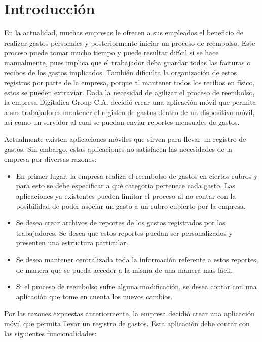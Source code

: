 \chapter*{Introducción} \label{sec:Introduccion}

\vspace{5 mm}
En la actualidad, muchas empresas le ofrecen a sus empleados el beneficio de realizar gastos personales y posteriormente iniciar un proceso de reembolso. Este proceso puede tomar mucho tiempo y puede resultar difícil si se hace manualmente, pues implica que el trabajador deba guardar todas las facturas o recibos de los gastos implicados. También dificulta la organización de estos registros por parte de la empresa, porque al mantener todos los recibos en físico, estos se pueden extraviar. Dada la necesidad de agilizar el proceso de reembolso, la empresa Digitalica Group C.A. decidió crear una aplicación móvil que permita a sus trabajadores mantener el registro de gastos dentro de un dispositivo móvil, así como un servidor al cual se puedan enviar reportes mensuales de gastos.

Actualmente existen aplicaciones móviles que sirven para llevar un registro de gastos. Sin embargo, estas aplicaciones no satisfacen las necesidades de la empresa por diversas razones:

\begin{itemize}
\item En primer lugar, la empresa realiza el reembolso de gastos en ciertos rubros y para esto se debe especificar a qué categoría pertenece cada gasto. Las aplicaciones ya existentes pueden limitar el proceso al no contar con la posibilidad de poder asociar un gasto a un rubro cubierto por la empresa.
\item Se desea crear archivos de reportes de los gastos registrados por los trabajadores. Se desea que estos reportes puedan ser personalizados y presenten una estructura particular.
\item Se desea mantener centralizada toda la información referente a estos reportes, de manera que se pueda acceder a la misma de una manera más fácil.
\item Si el proceso de reembolso sufre alguna modificación, se desea contar con una aplicación que tome en cuenta los nuevos cambios.
\end{itemize}

Por las razones expuestas anteriormente, la empresa decidió crear una aplicación móvil que permita llevar un registro de gastos. Esta aplicación debe contar con las siguientes funcionalidades:

